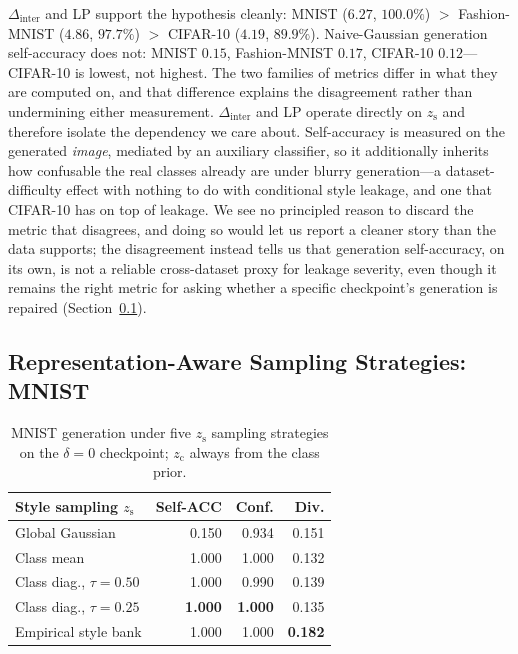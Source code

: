\documentclass[10pt,letterpaper]{article}
\newcommand{\zc}{z_{\mathrm{c}}}
\newcommand{\zs}{z_{\mathrm{s}}}
\begin{document}
$\Delta_{\mathrm{inter}}$ and LP support the hypothesis cleanly: MNIST
($6.27$, $100.0\%$) $>$ Fashion-MNIST ($4.86$, $97.7\%$) $>$ CIFAR-10
($4.19$, $89.9\%$). Naive-Gaussian generation self-accuracy does not:
MNIST $0.15$, Fashion-MNIST $0.17$, CIFAR-10 $0.12$---CIFAR-10 is lowest, not
highest. The two families of metrics differ in what they are computed on,
and that difference explains the disagreement rather than undermining
either measurement. $\Delta_{\mathrm{inter}}$ and LP operate directly on
$\zs$ and therefore isolate the dependency we care about. Self-accuracy is
measured on the generated \emph{image}, mediated by an auxiliary classifier,
so it additionally inherits how confusable the real classes already are
under blurry generation---a dataset-difficulty effect with nothing to do
with conditional style leakage, and one that CIFAR-10 has on top of leakage.
We see no principled reason to discard the metric that disagrees, and doing
so would let us report a cleaner story than the data supports; the
disagreement instead tells us that generation self-accuracy, on its own, is
not a reliable cross-dataset proxy for leakage severity, even though it
remains the right metric for asking whether a specific checkpoint's
generation is repaired (Section~\ref{sec:sampling}).

\subsection{Representation-Aware Sampling Strategies: MNIST}
\label{sec:sampling}

\begin{table}[t]
\centering
\small
\caption{MNIST generation under five $\zs$ sampling strategies on the
         $\delta{=}0$ checkpoint; $\zc$ always from the class prior.}
\label{tab:sampling}
\begin{tabular}{lrrr}
\toprule
Style sampling $\zs$ & Self-ACC & Conf. & Div. \\
\midrule
Global Gaussian            & 0.150 & 0.934 & 0.151 \\
Class mean                 & 1.000 & 1.000 & 0.132 \\
Class diag., $\tau{=}0.50$ & 1.000 & 0.990 & 0.139 \\
Class diag., $\tau{=}0.25$ & \textbf{1.000} & \textbf{1.000} & 0.135 \\
Empirical style bank       & 1.000 & 1.000 & \textbf{0.182} \\
\bottomrule
\end{tabular}
\end{table}
\end{document}
